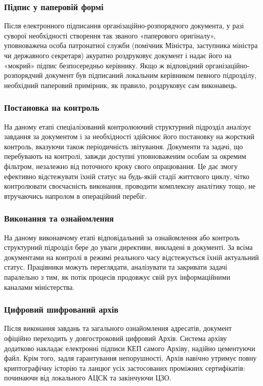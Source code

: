 \subsubsection*{Підпис у паперовій формі}

Після електронного підписання організаційно-розпорядчого документа, у разі суворої необхідності створення так званого «паперового оригіналу», уповноважена особа патронатної служби (помічник Міністра, заступника міністра чи державного секретаря) акуратно роздруковує документ і надає його на «мокрий» підпис безпосередньо керівнику. Якщо ж відповідний організаційно-розпорядчий документ був підписаний локальним керівником певного підрозділу, необхідний паперовий примірник, як правило, роздруковує сам виконавець.

\subsubsection*{Постановка на контроль}

На даному етапі спеціалізований контролюючий структурний підрозділ аналізує завдання за документом і за необхідності здійснює його постановку на жорсткий контроль, вказуючи також періодичність звітування. Документи та задачі, що перебувають на контролі, завжди доступні уповноваженим особам за окремим фільтром, незалежно від поточного кроку свого опрацювання. Це дає змогу ефективно відстежувати їхній статус на будь-якій стадії життєвого циклу, чітко контролювати своєчасність виконання, проводити комплексну аналітику тощо, не втручаючись напролом в операційний перебіг.

\subsubsection*{Виконання та ознайомлення}

На даному виконавчому етапі відповідальний за ознайомлення або контроль структурний підрозділ бере до уваги директиви, викладені в документі. За всіма документами на контролі в режимі реального часу відстежується їхній актуальний статус. Працівники можуть переглядати, аналізувати та закривати задачі паралельно з тим, як потік процесів продовжує свій рух інформаційними каналами міністерства.

\subsubsection*{Цифровий шифрований архів}

Після виконання завдань та загального ознайомлення адресатів, документ офіційно переходить у довгостроковий цифровий Архів. Система архіву додатково накладає електронні підписи КЕП самого Архіву, надійно цементуючи файл. Крім того, задля гарантування непорушності, Архів навічно утримує повну криптографічну історію та ланцюг усіх застосованих проміжних сертифікатів: починаючи від локального АЦСК та закінчуючи ЦЗО.

